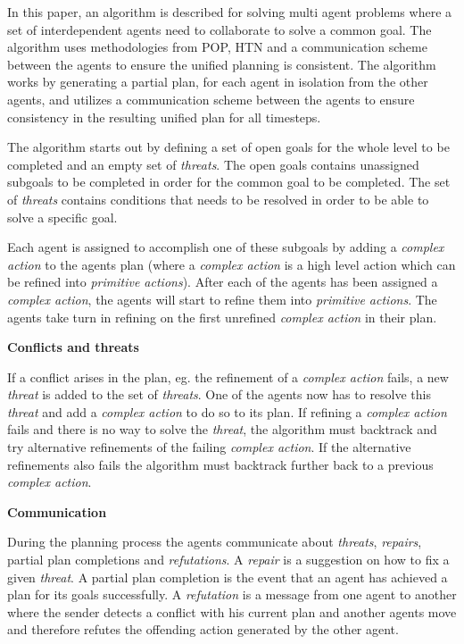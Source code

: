 \documentclass[Main]{subfiles}
\begin{document}
In this paper, an algorithm is described for solving multi agent problems where a set of interdependent agents need to collaborate to solve a common goal.
The algorithm uses methodologies from POP, HTN and a communication scheme between the agents to ensure the unified planning is consistent.
The algorithm works by generating a partial plan, for each agent in isolation from the other agents, and utilizes a communication scheme between the agents to ensure consistency in the resulting unified plan for all timesteps.

The algorithm starts out by defining a set of open goals for the whole level to be completed and an empty set of \textit{threats}.
The open goals contains unassigned subgoals to be completed in order for the common goal to be completed.
The set of \textit{threats} contains conditions that needs to be resolved in order to be able to solve a specific goal.

Each agent is assigned to accomplish one of these subgoals by adding a \textit{complex action} to the agents plan (where a \textit{complex action} is a high level action which can be refined into \textit{primitive actions}).
After each of the agents has been assigned a \textit{complex action}, the agents will start to refine them into \textit{primitive actions}.
The agents take turn in refining on the first unrefined \textit{complex action} in their plan.


\textbf{Conflicts and threats}

If a conflict arises in the plan, eg. the refinement of a \textit{complex action} fails, a new \textit{threat} is added to the set of \textit{threats}.
One of the agents now has to resolve this \textit{threat} and add a \textit{complex action} to do so to its plan.
If refining a \textit{complex action} fails and there is no way to solve the \textit{threat}, the algorithm must backtrack and try alternative refinements of the failing \textit{complex action}. If the alternative refinements also fails the algorithm must backtrack further back to a previous \textit{complex action}.


\textbf{Communication}

During the planning process the agents communicate about \textit{threats}, \textit{repairs}, partial plan completions and \textit{refutations}.
A \textit{repair} is a suggestion on how to fix a given \textit{threat}.
A partial plan completion is the event that an agent has achieved a plan for its goals successfully.
A \textit{refutation} is a message from one agent to another where the sender detects a conflict with his current plan and another agents move and therefore refutes the offending action generated by the other agent.
\end{document}
